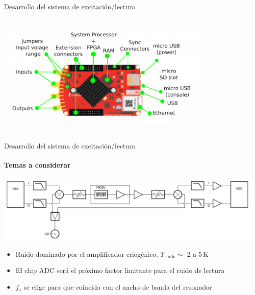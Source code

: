 \documentclass[ignorenonframetext,12pt]{beamer}
\begin{document}
\begin{frame}{Desarrollo del sistema de excitación/lectura}
\begin{columns}
\begin{column}{0.5\textwidth}
					\includegraphics[width=0.8\textwidth]{600px-RedPitaya_HW_overview}
				\end{column}
			\end{columns}
		\end{frame}
		\begin{frame}{Desarrollo del sistema de excitación/lectura}
			\framesubtitle{Temas a considerar}
			\centering
			\includegraphics[width=\textwidth]{readout1}

			\begin{itemize}
				\item Ruido \alert{dominado por el amplificador criogénico},
					$T_\text{ruido} \sim$ 2 a 5\,K 
				\item \alert{El chip ADC será el próximo factor
					limitante para el ruido de lectura}
				\item	$f_s$ se elige para que
					coincida con el ancho de banda del resonador
			\end{itemize}

		\end{frame}
\end{document}
